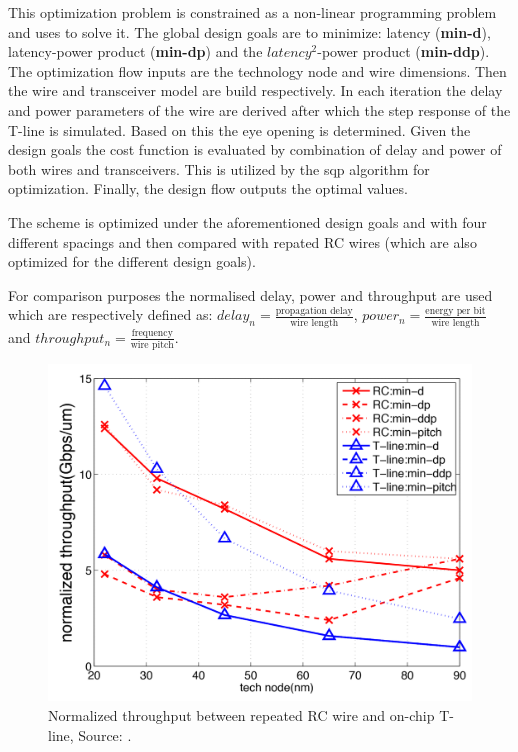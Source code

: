 This optimization problem is constrained as a non-linear programming problem and uses  to solve it.
The global design goals are to minimize: latency (\textbf{min-d}), latency-power product (\textbf{min-dp}) and the $latency^{2}$-power product (\textbf{min-ddp}).
The optimization flow inputs are the technology node and wire dimensions.
Then the wire and transceiver model are build respectively.
In each iteration the delay and power parameters of the wire are derived after which the step response of the T-line is simulated.
Based on this the eye opening is determined.
Given the design goals the cost function is evaluated by combination of delay and power of both wires and transceivers.
This is utilized by the \ac{sqp} algorithm for optimization.
Finally, the design flow outputs the optimal values.

The scheme is optimized under the aforementioned design goals and with four different spacings and then compared with repated RC wires (which are also optimized for the different design goals).

For comparison purposes the normalised delay, power and throughput are used which are respectively defined as: $delay_{n} = \frac{\text{propagation delay}}{\text{wire length}}$, $power_{n} = \frac{\text{energy per bit}}{\text{wire length}}$ and $throughput_{n} = \frac{\text{frequency}}{\text{wire pitch}}$.

\begin{figure}	\centering
	
	\includegraphics[width=0.95\linewidth]{Figures/Rep3NormThrough.png}
	\caption{Normalized throughput between repeated RC wire and on-chip T-line, Source: \cite{zhang2009high}.} 
    \label{fig:rep3:normthrough}
\end{figure}

